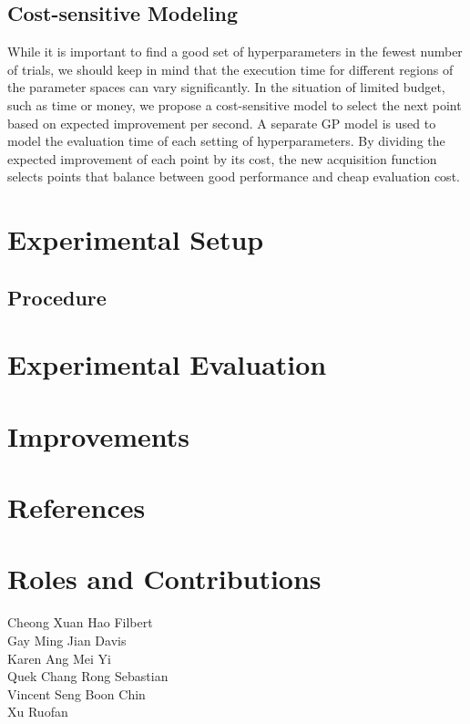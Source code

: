 \documentclass[letterpaper]{article}
\begin{document}
\subsection{Cost-sensitive Modeling}

While it is important to find a good set of hyperparameters in the fewest number of trials, we should keep in mind that the execution time for different regions of the parameter spaces can vary significantly. In the situation of limited budget, such as time or money, we propose a cost-sensitive model to select the next point based on expected improvement per second. A separate GP model is used to model the evaluation time of each setting of hyperparameters. By dividing the expected improvement of each point by its cost, the new acquisition function selects points that balance between good performance and cheap evaluation cost.

\section{Experimental Setup}

\subsection{Procedure}

\section{Experimental Evaluation}

\section{Improvements}

\section{References}

\section{Roles and Contributions}

\begin{description}
\item [Cheong Xuan Hao Filbert]
\item [Gay Ming Jian Davis]
\item [Karen Ang Mei Yi]
\item [Quek Chang Rong Sebastian]
\item [Vincent Seng Boon Chin]
\item [Xu Ruofan]
\end{description}
\end{document}
